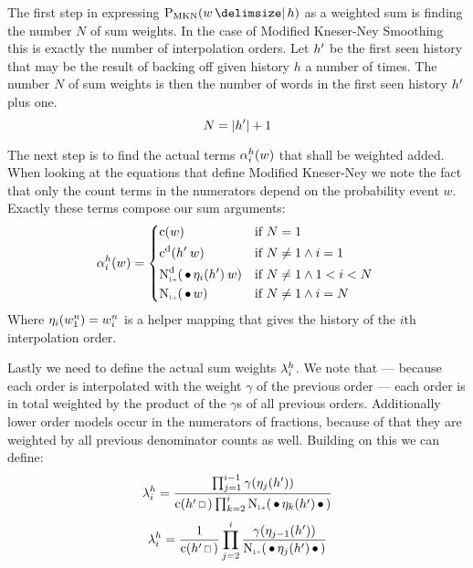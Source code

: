 The first step in expressing $\ProbMKN{w}{h}$ as a weighted sum is finding the
number $N$ of sum weights.
In the case of Modified Kneser-Ney Smoothing this is exactly the number of
interpolation orders.
Let $h^\prime$ be the first seen history that may be the result of backing
off given history $h$ a number of times.
The number $N$ of sum weights is then the number of words in the first seen
history $h^\prime$ plus one.
\begin{equation}
  N = {\left|h^\prime\right|} + 1
\end{equation}

The next step is to find the actual terms $\alpha_i^h(w)$ that shall be
weighted added.
When looking at the equations that define Modified Kneser-Ney we note the fact
that only the count terms in the numerators depend on the probability event $w$.
Exactly these terms compose our sum arguments:
\begin{equation}
  \SumArg_i^h(w) =
    \begin{dcases*}
      \Count(w)                                              & if $N = 1$ \\
      \DiscountedCount(\SeenHistory \: w)                    & if $N \neq 1 \land i = 1$ \\
      \DiscountedCount*(\WSkp \History_i(\SeenHistory) \: w) & if $N \neq 1 \land 1 < i < N$ \\
      \ContCountIp(\WSkp w)                                  & if $N \neq 1 \land i = N$
    \end{dcases*}
\end{equation}
Where $\eta_i(w_1^n) = w_i^n$ is a helper mapping that gives the history
of the $i$th interpolation order.

Lastly we need to define the actual sum weights $\lambda_i^h$.
We note that --- because each order is interpolated with the weight $\gamma$ of
the previous order --- each order is in total weighted by the product of the
$\gamma$s of all previous orders.
Additionally lower order models occur in the numerators of fractions, because of
that they are weighted by all previous denominator counts as well.
Building on this we can define:
\begin{equation}
  \label{eq:mkn-sumweight}
  \SumWeight_i^h = \frac{\prod_{j = 1}^{i - 1} \gamma(\History_j(\SeenHistory))}
                        {\Count(\SeenHistory \Skp) \prod_{k = 2}^{i} \ContCountIp(\WSkp \History_k(\SeenHistory) \WSkp)}
\end{equation}
\begin{equation}
  \SumWeight_i^h = \frac{1}{\Count(\SeenHistory \Skp)} \prod_{j = 2}^i \frac{\gamma(\History_{j-1}(\SeenHistory))}{\ContCountIp(\WSkp \History_j(\SeenHistory) \WSkp)}
\end{equation}

